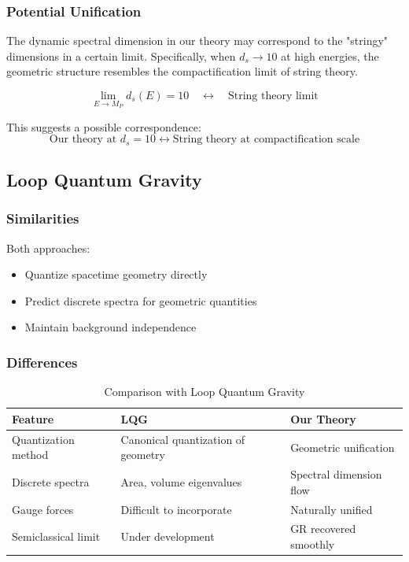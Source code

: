 \subsubsection{Potential Unification}

The dynamic spectral dimension in our theory may correspond to the "stringy" dimensions in a certain limit. Specifically, when $d_s \to 10$ at high energies, the geometric structure resembles the compactification limit of string theory.

\begin{equation}
    \lim_{E \to M_P} d_s(E) = 10 \quad \leftrightarrow \quad \text{String theory limit}
\end{equation}

This suggests a possible correspondence:
\begin{equation}
    \text{Our theory at } d_s = 10 \longleftrightarrow \text{String theory at compactification scale}
\end{equation}

\subsection{Loop Quantum Gravity}

\subsubsection{Similarities}

Both approaches:
\begin{itemize}
    \item Quantize spacetime geometry directly
    \item Predict discrete spectra for geometric quantities
    \item Maintain background independence
\end{itemize}

\subsubsection{Differences}

\begin{table}[htbp]
\centering
\caption{Comparison with Loop Quantum Gravity}
\label{tab:lqg_comparison}
\begin{tabular}{p{4cm}p{4cm}p{4cm}}
\hline
\textbf{Feature} & \textbf{LQG} & \textbf{Our Theory} \\
\hline
Quantization method & Canonical quantization of geometry & Geometric unification \\
Discrete spectra & Area, volume eigenvalues & Spectral dimension flow \\
Gauge forces & Difficult to incorporate & Naturally unified \\
Semiclassical limit & Under development & GR recovered smoothly \\
\hline
\end{tabular}
\end{table}

